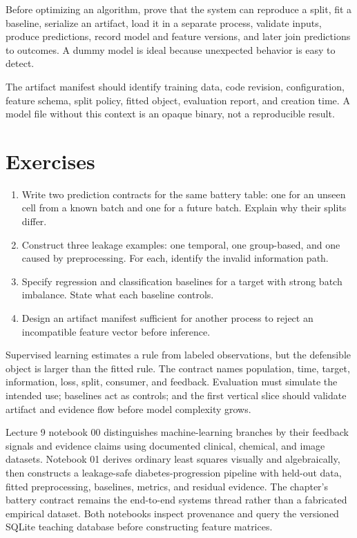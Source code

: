 Before optimizing an algorithm, prove that the system can reproduce a split,
fit a baseline, serialize an artifact, load it in a separate process, validate
inputs, produce predictions, record model and feature versions, and later join
predictions to outcomes. A dummy model is ideal because unexpected behavior is
easy to detect.

The artifact manifest should identify training data, code revision,
configuration, feature schema, split policy, fitted object, evaluation report,
and creation time. A model file without this context is an opaque binary, not a
reproducible result.

\section{Exercises}

\begin{enumerate}
  \item Write two prediction contracts for the same battery table: one for an
  unseen cell from a known batch and one for a future batch. Explain why their
  splits differ.
  \item Construct three leakage examples: one temporal, one group-based, and
  one caused by preprocessing. For each, identify the invalid information path.
  \item Specify regression and classification baselines for a target with strong
  batch imbalance. State what each baseline controls.
  \item Design an artifact manifest sufficient for another process to reject an
  incompatible feature vector before inference.
\end{enumerate}

\begin{chapterreview}
Supervised learning estimates a rule from labeled observations, but the
defensible object is larger than the fitted rule. The contract names population,
time, target, information, loss, split, consumer, and feedback. Evaluation must
simulate the intended use; baselines act as controls; and the first vertical
slice should validate artifact and evidence flow before model complexity grows.
\end{chapterreview}

\begin{notebooklink}
Lecture 9 notebook 00 distinguishes machine-learning branches by their feedback
signals and evidence claims using documented clinical, chemical, and image
datasets. Notebook 01 derives ordinary least squares visually and algebraically,
then constructs a leakage-safe diabetes-progression pipeline with held-out data,
fitted preprocessing, baselines, metrics, and residual evidence. The chapter's
battery contract remains the end-to-end systems thread rather than a fabricated
empirical dataset. Both notebooks inspect provenance and query the versioned
SQLite teaching database before constructing feature matrices.
\end{notebooklink}
